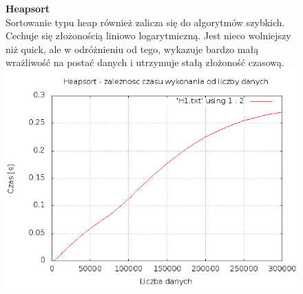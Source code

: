\documentclass[a4paper,11pt]{report}
\begin{document}
\begin{figure}
  \begin{center}
  \textbf{Heapsort}
  \\Sortowanie typu heap również zalicza się do algorytmów szybkich. Cechuje się złożonością liniowo logarytmiczną. Jest nieco wolniejszy niż quick, ale w odróżnieniu od tego, wykazuje bardzo małą wrażliwość na postać danych i utrzymuje stałą złożoność czasową. 
  \\
    \includegraphics[scale=0.5]{./heap1.png}
    \label{fig:}
  \end{center}
\end{figure}
\end{document}
